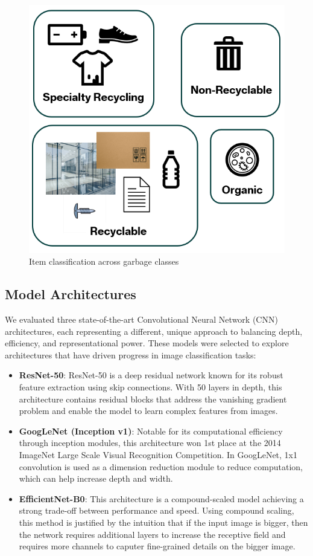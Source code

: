 \documentclass[11pt,twocolumn]{article}
\begin{document}
\begin{figure}[h]
    \centering
    \includegraphics[width=0.8\linewidth]{dataset_classes.png}
    \caption{Item classification across garbage classes}
    \label{fig:dataset}
\end{figure}

\subsection{Model Architectures}
We evaluated three state-of-the-art Convolutional Neural Network (CNN) architectures, each representing a different, unique approach to balancing depth, efficiency, and representational power. These models were selected to explore architectures that have driven progress in image classification tasks:
\begin{itemize}
    \item \textbf{ResNet-50}: ResNet-50 is a deep residual network known for its robust feature extraction using skip connections. With 50 layers in depth, this architecture contains residual blocks that address the vanishing gradient problem and enable the model to learn complex features from images.
    \item \textbf{GoogLeNet (Inception v1)}: Notable for its computational efficiency through inception modules, this architecture won 1st place at the 2014 ImageNet Large Scale Visual Recognition Competition. In GoogLeNet, 1x1 convolution is used as a dimension reduction module to reduce computation, which can help increase depth and width. 
    \item \textbf{EfficientNet-B0}: This architecture is a compound-scaled model achieving a strong trade-off between performance and speed. Using compound scaling, this method is justified by the intuition that if the input image is bigger, then the network requires additional layers to increase the receptive field and requires more channels to caputer fine-grained details on the bigger image. 
\end{itemize}
\end{document}
